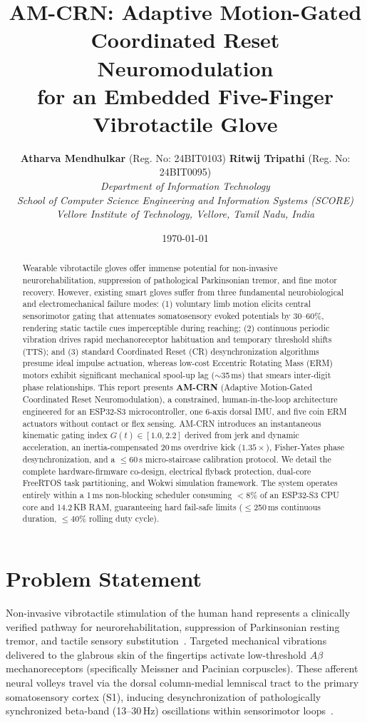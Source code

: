 \documentclass[10pt,twocolumn]{article}
\title{\textbf{\Large AM-CRN: Adaptive Motion-Gated Coordinated Reset Neuromodulation\\for an Embedded Five-Finger Vibrotactile Glove}}
\author{
    \textbf{Atharva Mendhulkar} \quad (Reg. No: 24BIT0103) \qquad
    \textbf{Ritwij Tripathi} \quad (Reg. No: 24BIT0095) \\[1ex]
    \textit{Department of Information Technology} \\
    \textit{School of Computer Science Engineering and Information Systems (SCORE)} \\
    \textit{Vellore Institute of Technology, Vellore, Tamil Nadu, India}
}
\date{\today}
\begin{document}
\maketitle

\begin{abstract}
Wearable vibrotactile gloves offer immense potential for non-invasive neurorehabilitation, suppression of pathological Parkinsonian tremor, and fine motor recovery. However, existing smart gloves suffer from three fundamental neurobiological and electromechanical failure modes: (1) voluntary limb motion elicits central sensorimotor gating that attenuates somatosensory evoked potentials by 30--60\%, rendering static tactile cues imperceptible during reaching; (2) continuous periodic vibration drives rapid mechanoreceptor habituation and temporary threshold shifts (TTS); and (3) standard Coordinated Reset (CR) desynchronization algorithms presume ideal impulse actuation, whereas low-cost Eccentric Rotating Mass (ERM) motors exhibit significant mechanical spool-up lag ($\sim$35\,ms) that smears inter-digit phase relationships. 
This report presents \textbf{AM-CRN} (Adaptive Motion-Gated Coordinated Reset Neuromodulation), a constrained, human-in-the-loop architecture engineered for an ESP32-S3 microcontroller, one 6-axis dorsal IMU, and five coin ERM actuators without contact or flex sensing. AM-CRN introduces an instantaneous kinematic gating index $G(t) \in [1.0, 2.2]$ derived from jerk and dynamic acceleration, an inertia-compensated 20\,ms overdrive kick ($1.35\times$), Fisher-Yates phase desynchronization, and a $\le$60\,s micro-staircase calibration protocol. 
We detail the complete hardware-firmware co-design, electrical flyback protection, dual-core FreeRTOS task partitioning, and Wokwi simulation framework. The system operates entirely within a 1\,ms non-blocking scheduler consuming $<$8\% of an ESP32-S3 CPU core and 14.2\,KB RAM, guaranteeing hard fail-safe limits ($\le$250\,ms continuous duration, $\le$40\% rolling duty cycle).
\end{abstract}

\section{Problem Statement}
Non-invasive vibrotactile stimulation of the human hand represents a clinically verified pathway for neurorehabilitation, suppression of Parkinsonian resting tremor, and tactile sensory substitution~\cite{springer_2026_smart_glove_slr, frontiers_2026_vibrotactile_neurorehab_slr}. Targeted mechanical vibrations delivered to the glabrous skin of the fingertips activate low-threshold $A\beta$ mechanoreceptors (specifically Meissner and Pacinian corpuscles). These afferent neural volleys travel via the dorsal column-medial lemniscal tract to the primary somatosensory cortex (S1), inducing desynchronization of pathologically synchronized beta-band (13--30\,Hz) oscillations within sensorimotor loops~\cite{jneurophys_2023_somatosensory_finger_rep}.
\end{document}
